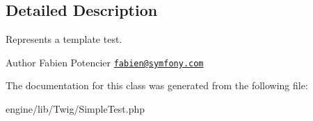 \subsection{Detailed Description}
Represents a template test.

\begin{DoxyAuthor}{Author}
Fabien Potencier \href{mailto:fabien@symfony.com}{\tt fabien@symfony.\+com} 
\end{DoxyAuthor}


The documentation for this class was generated from the following file\+:\begin{DoxyCompactItemize}
\item 
engine/lib/\+Twig/Simple\+Test.\+php\end{DoxyCompactItemize}
